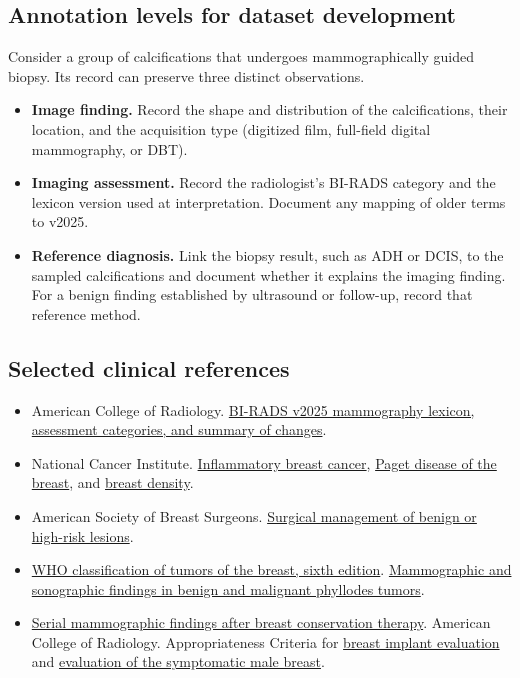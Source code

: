 \subsection{Annotation levels for dataset development}
Consider a group of calcifications that undergoes mammographically guided biopsy. Its record can preserve three distinct observations.
\begin{itemize}
    \item \textbf{Image finding.} Record the shape and distribution of the calcifications, their location, and the acquisition type (digitized film, full-field digital mammography, or DBT).
    \item \textbf{Imaging assessment.} Record the radiologist's BI-RADS category and the lexicon version used at interpretation. Document any mapping of older terms to v2025.
    \item \textbf{Reference diagnosis.} Link the biopsy result, such as ADH or DCIS, to the sampled calcifications and document whether it explains the imaging finding. For a benign finding established by ultrasound or follow-up, record that reference method.
\end{itemize}

\subsection{Selected clinical references}
\begin{itemize}
    \item American College of Radiology. \href{https://www.acr.org/Clinical-Resources/Clinical-Tools-and-Reference/Reporting-and-Data-Systems/BI-RADS}{BI-RADS v2025 mammography lexicon, assessment categories, and summary of changes}.
    \item National Cancer Institute. \href{https://www.cancer.gov/types/breast/breast-cancer-types/inflammatory}{Inflammatory breast cancer}, \href{https://www.cancer.gov/types/breast/breast-cancer-types/paget-disease-breast}{Paget disease of the breast}, and \href{https://www.cancer.gov/types/breast/screening/dense-breasts}{breast density}.
    \item American Society of Breast Surgeons. \href{https://www.breastsurgeons.org/docs/statements/asbrs-high-risk-lesions.pdf}{Surgical management of benign or high-risk lesions}.
    \item \href{https://pmc.ncbi.nlm.nih.gov/articles/PMC13341065/}{WHO classification of tumors of the breast, sixth edition}. \href{https://pubmed.ncbi.nlm.nih.gov/8539362/}{Mammographic and sonographic findings in benign and malignant phyllodes tumors}.
    \item \href{https://pubmed.ncbi.nlm.nih.gov/8659366/}{Serial mammographic findings after breast conservation therapy}. American College of Radiology. Appropriateness Criteria for \href{https://acsearch.acr.org/docs/3100728/Narrative}{breast implant evaluation} and \href{https://acsearch.acr.org/docs/3091547/Narrative}{evaluation of the symptomatic male breast}.
\end{itemize}
